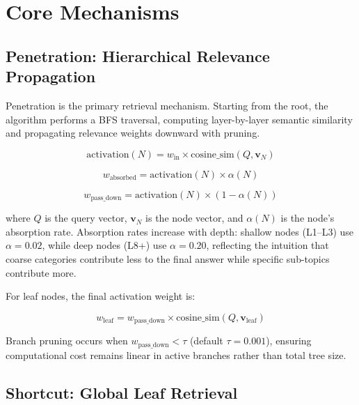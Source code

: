 \documentclass[11pt,a4paper]{article}
\begin{document}
\section{Core Mechanisms}
\label{sec:mechanisms}

\subsection{Penetration: Hierarchical Relevance Propagation}

Penetration is the primary retrieval mechanism. Starting from the root, the algorithm performs a BFS traversal, computing layer-by-layer semantic similarity and propagating relevance weights downward with pruning.

\begin{equation}
\text{activation}(N) = w_{\text{in}} \times \text{cosine\_sim}(Q, \mathbf{v}_N)
\label{eq:activation}
\end{equation}

\begin{equation}
w_{\text{absorbed}} = \text{activation}(N) \times \alpha(N)
\label{eq:absorbed}
\end{equation}

\begin{equation}
w_{\text{pass\_down}} = \text{activation}(N) \times (1 - \alpha(N))
\label{eq:passdown}
\end{equation}

where $Q$ is the query vector, $\mathbf{v}_N$ is the node vector, and $\alpha(N)$ is the node's absorption rate. Absorption rates increase with depth: shallow nodes (L1--L3) use $\alpha = 0.02$, while deep nodes (L8+) use $\alpha = 0.20$, reflecting the intuition that coarse categories contribute less to the final answer while specific sub-topics contribute more.

For leaf nodes, the final activation weight is:

\begin{equation}
w_{\text{leaf}} = w_{\text{pass\_down}} \times \text{cosine\_sim}(Q, \mathbf{v}_{\text{leaf}})
\label{eq:leaf}
\end{equation}

Branch pruning occurs when $w_{\text{pass\_down}} < \tau$ (default $\tau = 0.001$), ensuring computational cost remains linear in active branches rather than total tree size.

\subsection{Shortcut: Global Leaf Retrieval}
\end{document}
